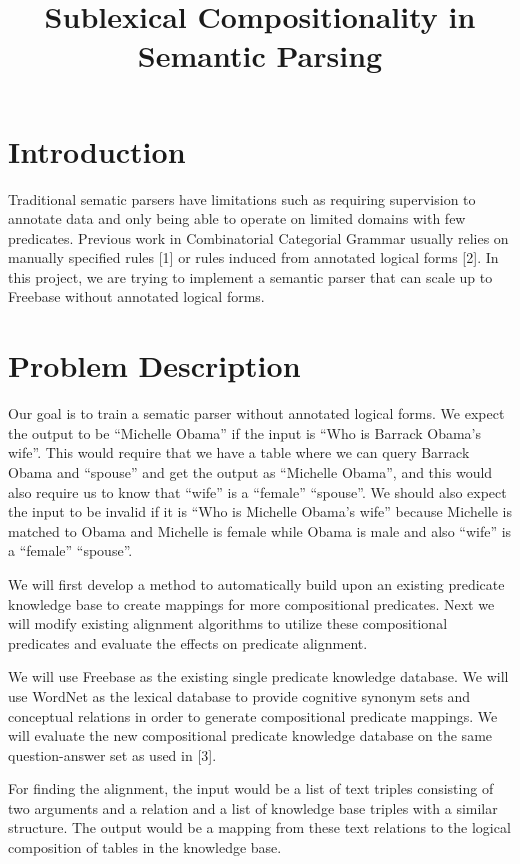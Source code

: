 \documentclass[12pt, a4paper]{article}
\title{Sublexical Compositionality in Semantic Parsing}
\begin{document}
\maketitle

\section{Introduction}
Traditional sematic parsers have limitations such as requiring supervision to annotate data and only being able to operate on limited domains with few predicates. Previous work in Combinatorial Categorial Grammar usually relies on manually specified rules [1] or rules induced from annotated logical forms [2]. In this project, we are trying to implement a semantic parser that can scale up to Freebase without annotated logical forms. 

\section{Problem Description}
Our goal is to train a sematic parser without annotated logical forms. We expect the output to be “Michelle Obama” if the input is “Who is Barrack Obama’s wife”. This would require that we have a table where we can query Barrack Obama and “spouse” and get the output as “Michelle Obama”, and this would also require us to know that “wife” is a “female” “spouse”. We should also expect the input to be invalid if it is “Who is Michelle Obama’s wife” because Michelle is matched to Obama and Michelle is female while Obama is male and also “wife” is a “female” “spouse”.

We will first develop a method to automatically build upon an existing predicate knowledge base to create mappings for more compositional predicates. Next we will modify existing alignment algorithms to utilize these compositional predicates and evaluate the effects on predicate alignment.

We will use Freebase as the existing single predicate knowledge database. We will use WordNet as the lexical database to provide cognitive synonym sets and conceptual relations in order to generate compositional predicate mappings. We will evaluate the new compositional predicate knowledge database on the same question-answer set as used in [3]. 

For finding the alignment, the input would be a list of text triples consisting of two arguments and a relation and a list of knowledge base triples with a similar structure. The output would be a mapping from these text relations to the logical composition of tables in the knowledge base.
\end{document}
